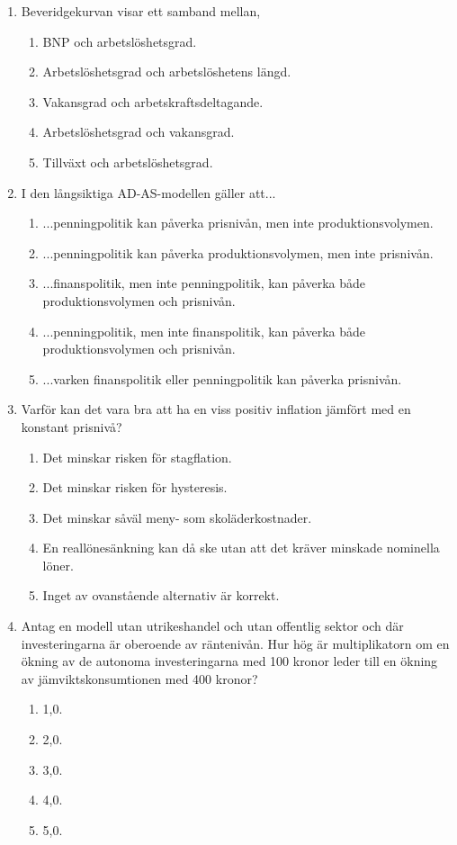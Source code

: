 \documentclass[12pt,a4paper]{article}
\begin{document}
\begin{enumerate}[label=\arabic*.]
    \item Beveridgekurvan visar ett samband mellan,
    \begin{enumerate}[label=\Alph*.]
        \item BNP och arbetslöshetsgrad.
        \item Arbetslöshetsgrad och arbetslöshetens längd.
        \item Vakansgrad och arbetskraftsdeltagande.
        \item Arbetslöshetsgrad och vakansgrad.
        \item Tillväxt och arbetslöshetsgrad.
    \end{enumerate}

    \item I den långsiktiga AD-AS-modellen gäller att...
    \begin{enumerate}[label=\Alph*.]
        \item ...penningpolitik kan påverka prisnivån, men inte produktionsvolymen.
        \item ...penningpolitik kan påverka produktionsvolymen, men inte prisnivån.
        \item ...finanspolitik, men inte penningpolitik, kan påverka både produktionsvolymen och prisnivån.
        \item ...penningpolitik, men inte finanspolitik, kan påverka både produktionsvolymen och prisnivån.
        \item ...varken finanspolitik eller penningpolitik kan påverka prisnivån.
    \end{enumerate}

    \item Varför kan det vara bra att ha en viss positiv inflation jämfört med en konstant prisnivå?
    \begin{enumerate}[label=\Alph*.]
        \item Det minskar risken för stagflation.
        \item Det minskar risken för hysteresis.
        \item Det minskar såväl meny- som skoläderkostnader.
        \item En reallönesänkning kan då ske utan att det kräver minskade nominella löner.
        \item Inget av ovanstående alternativ är korrekt.
    \end{enumerate}

    \item Antag en modell utan utrikeshandel och utan offentlig sektor och där investeringarna är oberoende av räntenivån. Hur hög är multiplikatorn om en ökning av de autonoma investeringarna med 100 kronor leder till en ökning av jämviktskonsumtionen med 400 kronor?
    \begin{enumerate}[label=\Alph*.]
        \item 1,0.
        \item 2,0.
        \item 3,0.
        \item 4,0.
        \item 5,0.
    \end{enumerate}


\end{enumerate}
\end{document}
